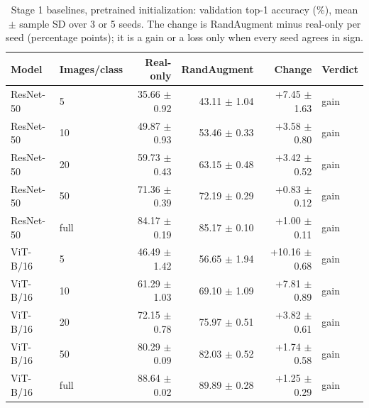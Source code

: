 \begin{table}[H]
\centering
\caption{Stage 1 baselines, pretrained initialization: validation top-1 accuracy (\%), mean $\pm$ sample SD over 3 or 5 seeds. The change is RandAugment minus real-only per seed (percentage points); it is a gain or a loss only when every seed agrees in sign.}
\label{tab:stage1-pretrained-accuracy}
\begin{tabular}{llrrrl}
\toprule
Model & Images/class & Real-only & RandAugment & Change & Verdict \\
\midrule
ResNet-50 & 5 & 35.66 $\pm$ 0.92 & 43.11 $\pm$ 1.04 & +7.45 $\pm$ 1.63 & gain \\
ResNet-50 & 10 & 49.87 $\pm$ 0.93 & 53.46 $\pm$ 0.33 & +3.58 $\pm$ 0.80 & gain \\
ResNet-50 & 20 & 59.73 $\pm$ 0.43 & 63.15 $\pm$ 0.48 & +3.42 $\pm$ 0.52 & gain \\
ResNet-50 & 50 & 71.36 $\pm$ 0.39 & 72.19 $\pm$ 0.29 & +0.83 $\pm$ 0.12 & gain \\
ResNet-50 & full & 84.17 $\pm$ 0.19 & 85.17 $\pm$ 0.10 & +1.00 $\pm$ 0.11 & gain \\
\midrule
ViT-B/16 & 5 & 46.49 $\pm$ 1.42 & 56.65 $\pm$ 1.94 & +10.16 $\pm$ 0.68 & gain \\
ViT-B/16 & 10 & 61.29 $\pm$ 1.03 & 69.10 $\pm$ 1.09 & +7.81 $\pm$ 0.89 & gain \\
ViT-B/16 & 20 & 72.15 $\pm$ 0.78 & 75.97 $\pm$ 0.51 & +3.82 $\pm$ 0.61 & gain \\
ViT-B/16 & 50 & 80.29 $\pm$ 0.09 & 82.03 $\pm$ 0.52 & +1.74 $\pm$ 0.58 & gain \\
ViT-B/16 & full & 88.64 $\pm$ 0.02 & 89.89 $\pm$ 0.28 & +1.25 $\pm$ 0.29 & gain \\
\bottomrule
\end{tabular}
\end{table}
